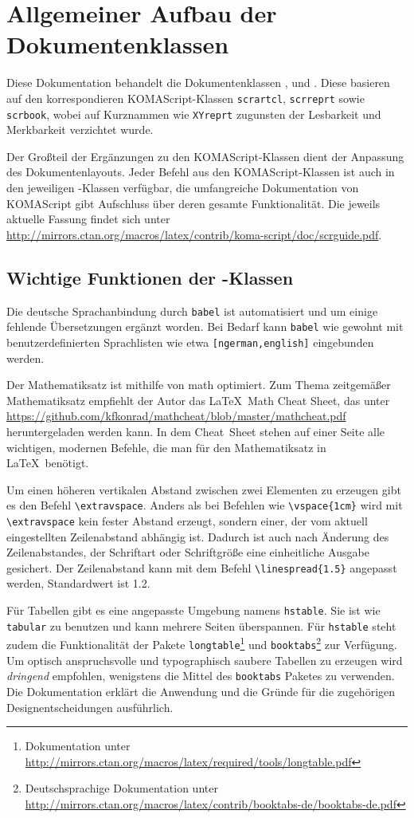 \section{Allgemeiner Aufbau der Dokumentenklassen}

Diese Dokumentation behandelt die Dokumentenklassen \HSKLarticle,
\HSKLreport und \HSKLbook. Diese basieren auf den korrespondieren
KOMAScript-Klassen \verb!scrartcl!, \verb!scrreprt! sowie \verb!scrbook!, wobei
auf Kurznammen wie \verb!XYreprt! zugunsten der Lesbarkeit und Merkbarkeit
verzichtet wurde.

Der Großteil der Ergänzungen zu den KOMAScript-Klassen dient der Anpassung des
Dokumentenlayouts. Jeder Befehl aus den KOMAScript-Klassen ist auch in den
jeweiligen \HSKL-Klassen verfügbar, die umfangreiche Dokumentation von KOMAScript
gibt Aufschluss über deren gesamte Funktionalität. Die jeweils aktuelle Fassung
findet sich unter \url{http://mirrors.ctan.org/macros/latex/contrib/koma-script/doc/scrguide.pdf}.

\subsection{Wichtige Funktionen der \HSKL-Klassen}
Die deutsche Sprachanbindung durch \verb!babel! ist automatisiert und
um einige fehlende Übersetzungen ergänzt worden. Bei Bedarf kann \verb!babel!
wie gewohnt mit benutzerdefinierten Sprachlisten wie etwa \verb![ngerman,english]! eingebunden werden.

Der Mathematiksatz ist mithilfe von \AmS\hspace{1pt}math optimiert. Zum Thema
zeitgemäßer Mathematiksatz empfiehlt der Autor das \LaTeX\ Math Cheat Sheet,
das unter \url{https://github.com/kfkonrad/mathcheat/blob/master/mathcheat.pdf}
heruntergeladen werden kann. In dem Cheat~Sheet stehen auf einer Seite alle
wichtigen, modernen Befehle, die man für den Mathematiksatz in \LaTeX\ benötigt.

Um einen höheren vertikalen Abstand zwischen zwei Elementen zu erzeugen gibt es
den Befehl \verb!\extravspace!. Anders als bei Befehlen wie \verb!\vspace{1cm}!
wird mit \verb!\extravspace! kein fester Abstand erzeugt, sondern einer, der vom
aktuell eingestellten Zeilenabstand abhängig ist. Dadurch ist auch nach Änderung
des Zeilenabstandes, der Schriftart oder Schriftgröße eine einheitliche Ausgabe
gesichert.
Der Zeilenabstand kann mit dem Befehl \verb!\linespread{1.5}! angepasst werden,
Standardwert ist 1.2.

Für Tabellen gibt es eine angepasste Umgebung namens \verb!hstable!. Sie ist
wie \verb!tabular! zu benutzen und kann mehrere Seiten überspannen. Für
\verb!hstable! steht zudem die Funktionalität der Pakete
\verb!longtable!\footnote{Dokumentation unter
\url{http://mirrors.ctan.org/macros/latex/required/tools/longtable.pdf}}
und \verb!booktabs!\footnote{Deutschsprachige Dokumentation unter
\url{http://mirrors.ctan.org/macros/latex/contrib/booktabs-de/booktabs-de.pdf}}
zur Verfügung. Um optisch anspruchsvolle und typographisch saubere Tabellen zu
erzeugen wird \emph{dringend} empfohlen, wenigstens die Mittel des
\verb!booktabs! Paketes zu verwenden. Die Dokumentation erklärt die Anwendung
und die Gründe für die zugehörigen Designentscheidungen ausführlich.

